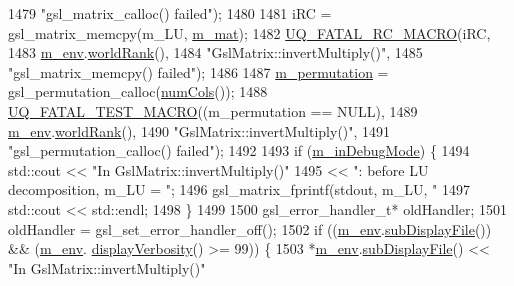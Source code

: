 \begin{DoxyCode}
1479                         \textcolor{stringliteral}{"gsl\_matrix\_calloc() failed"});
1480 
1481     iRC = gsl\_matrix\_memcpy(m\_LU, \hyperlink{class_q_u_e_s_o_1_1_gsl_matrix_a2cac0bd065e280a06445f944d5f3e3b3}{m\_mat});
1482     \hyperlink{_defines_8h_aa9107e1a9a5197371a412db3fa349988}{UQ\_FATAL\_RC\_MACRO}(iRC,
1483                       \hyperlink{class_q_u_e_s_o_1_1_matrix_a247fb0fc0b87fecdee054bb4660b68e8}{m\_env}.\hyperlink{class_q_u_e_s_o_1_1_base_environment_a78b57112bbd0e6dd0e8afec00b40ffa7}{worldRank}(),
1484                       \textcolor{stringliteral}{"GslMatrix::invertMultiply()"},
1485                       \textcolor{stringliteral}{"gsl\_matrix\_memcpy() failed"});
1486 
1487     \hyperlink{class_q_u_e_s_o_1_1_gsl_matrix_a673277a250dca216e0e414110f63a9af}{m\_permutation} = gsl\_permutation\_calloc(\hyperlink{class_q_u_e_s_o_1_1_gsl_matrix_ad5005f168fe030468e834776afb1859b}{numCols}());
1488     \hyperlink{_defines_8h_a56d63d18d0a6d45757de47fcc06f574d}{UQ\_FATAL\_TEST\_MACRO}((m\_permutation == NULL),
1489                         \hyperlink{class_q_u_e_s_o_1_1_matrix_a247fb0fc0b87fecdee054bb4660b68e8}{m\_env}.\hyperlink{class_q_u_e_s_o_1_1_base_environment_a78b57112bbd0e6dd0e8afec00b40ffa7}{worldRank}(),
1490                         \textcolor{stringliteral}{"GslMatrix::invertMultiply()"},
1491                         \textcolor{stringliteral}{"gsl\_permutation\_calloc() failed"});
1492 
1493     \textcolor{keywordflow}{if} (\hyperlink{class_q_u_e_s_o_1_1_matrix_a3384d3fc1a1058fce9191b0d74653911}{m\_inDebugMode}) \{
1494       std::cout << \textcolor{stringliteral}{"In GslMatrix::invertMultiply()"}
1495                 << \textcolor{stringliteral}{": before LU decomposition, m\_LU = "};
1496       gsl\_matrix\_fprintf(stdout, m\_LU, \textcolor{stringliteral}{"%
1497       std::cout << std::endl;
1498     \}
1499 
1500     gsl\_error\_handler\_t* oldHandler;
1501     oldHandler = gsl\_set\_error\_handler\_off();
1502     \textcolor{keywordflow}{if} ((\hyperlink{class_q_u_e_s_o_1_1_matrix_a247fb0fc0b87fecdee054bb4660b68e8}{m\_env}.\hyperlink{class_q_u_e_s_o_1_1_base_environment_a8a0064746ae8dddfece4229b9ad374d6}{subDisplayFile}()) && (\hyperlink{class_q_u_e_s_o_1_1_matrix_a247fb0fc0b87fecdee054bb4660b68e8}{m\_env}.
      \hyperlink{class_q_u_e_s_o_1_1_base_environment_a1fe5f244fc0316a0ab3e37463f108b96}{displayVerbosity}() >= 99)) \{
1503       *\hyperlink{class_q_u_e_s_o_1_1_matrix_a247fb0fc0b87fecdee054bb4660b68e8}{m\_env}.\hyperlink{class_q_u_e_s_o_1_1_base_environment_a8a0064746ae8dddfece4229b9ad374d6}{subDisplayFile}() << \textcolor{stringliteral}{"In GslMatrix::invertMultiply()"}
}
\end{DoxyCode}
